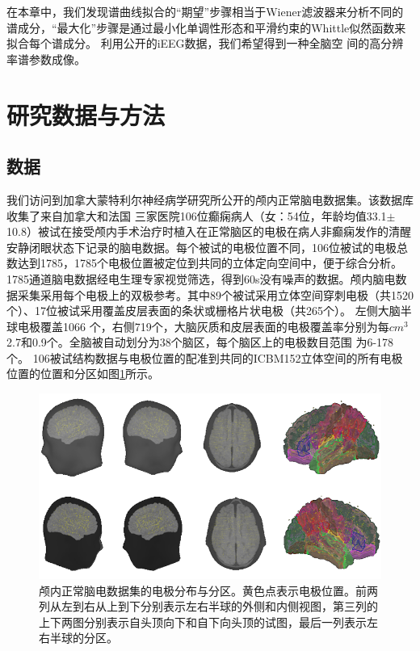 在本章中，我们发现谱曲线拟合的“期望”步骤相当于Wiener滤波器来分析不同的谱成分，“最大化”步骤是通过最小化单调性形态和平滑约束的Whittle似然函数来拟合每个谱成分。 利用公开的iEEG数据，我们希望得到一种全脑空
间的高分辨率谱参数成像。

\section{研究数据与方法}
\subsection{数据}
我们访问到加拿大蒙特利尔神经病学研究所公开的颅内正常脑电数据集。该数据库收集了来自加拿大和法国
三家医院106位癫痫病人（女：54位，年龄均值33.1$\pm$10.8）被试在接受颅内手术治疗时植入在正常脑区的电极在病人非癫痫发作的清醒安静闭眼状态下记录的脑电数据。每个被试的电极位置不同，106位被试的电极总数达到1785，1785个电极位置被定位到共同的立体定向空间中，便于综合分析。1785通道脑电数据经电生理专家视觉筛选，得到60s没有噪声的数据。颅内脑电数据采集采用每个电极上的双极参考。其中89个被试采用立体空间穿刺电极（共1520个）、17位被试采用覆盖皮层表面的条状或栅格片状电极（共265个）。 左侧大脑半球电极覆盖1066
个，右侧719个，大脑灰质和皮层表面的电极覆盖率分别为每$cm^3$2.7和0.9个。全脑被自动划分为38个脑区，每个脑区上的电极数目范围
为6-178个。 106被试结构数据与电极位置的配准到共同的ICBM152立体空间的所有电极位置的位置和分区如图\ref{electrodes}所示。
\begin{figure}
\includegraphics[width=15cm]{pic/xipi/electrodes.png}
\caption{颅内正常脑电数据集的电极分布与分区。黄色点表示电极位置。前两列从左到右从上到下分别表示左右半球的外侧和内侧视图，第三列的上下两图分别表示自头顶向下和自下向头顶的试图，最后一列表示左右半球的分区。}
\label{electrodes}
\end{figure}

